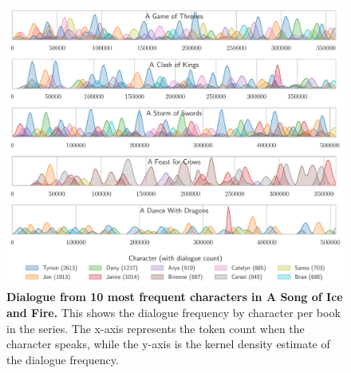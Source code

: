 \documentclass[fleqn,moreauthors,10pt]{ds_report}
\begin{document}
\begin{figure}[htb]
	\centering
	\includegraphics[width=\linewidth]{asoif_dialogue.pdf}
	\caption{\textbf{Dialogue from 10 most frequent characters in A Song of Ice and Fire.} This shows the dialogue frequency by character per book in the series. The x-axis represents the token count when the character speaks, while the y-axis is the kernel density estimate of the dialogue frequency.}
	\label{fig:asoif_dialogue}
\end{figure}
\end{document}
